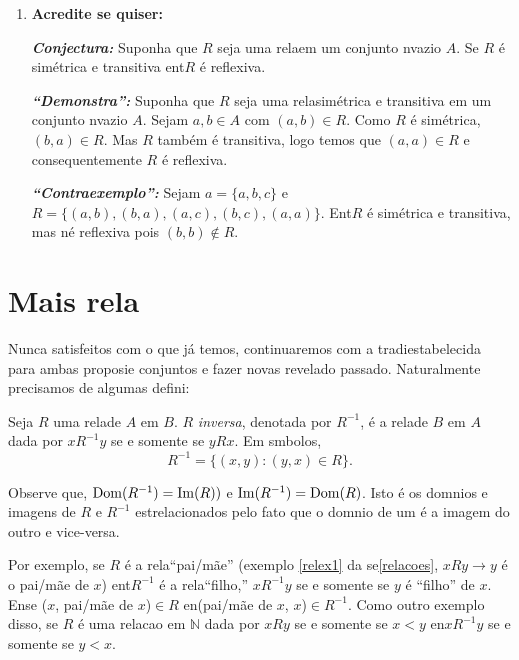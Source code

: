 \begin{enumerate}[{\bf 1.}]
\noindent \textit{\textbf{``Demonstra\caoi'':}} Seja $R$ uma rela\cao em um conjunto n\ao vazio $A$. Suponha $a,b\in A$ com $(a,b)\in R$. Como $R$ n\ao \'e sim\'etrica, $(b,a)\notin R$ logo $R$ \'e assim\'etrica.

\noindent \textit{\textbf{``Contraexemplo'':}} Sejam $A=\{1,2,3\}$ e $R=\{(1,2),(2,1),(1,3)\}$. Ent\ao $R$ n\ao \'e sim\'etrica nem assim\'etrica.

\item {\bf Acredite se quiser:}  

\noindent \textit{\textbf{Conjectura:}} Suponha que $R$ seja uma rela\cao em um conjunto n\ao vazio $A$. Se $R$ \'e sim\'etrica e transitiva ent\ao $R$ \'e reflexiva. 

\noindent \textit{\textbf{``Demonstra\caoi'':}} Suponha que $R$ seja uma rela\cao sim\'etrica e transitiva em um conjunto n\ao vazio $A$. Sejam $a,b\in A$ com $(a,b)\in R$. Como $R$ \'e sim\'etrica, $(b,a)\in R$. Mas $R$ tamb\'em \'e transitiva, logo temos que $(a,a)\in R$ e consequentemente $R$ \'e reflexiva.

\noindent \textit{\textbf{``Contraexemplo'':}} Sejam $a=\{a,b,c\}$ e $R=\{(a,b), (b,a), (a,c), (b,c), (a,a)\}$. Ent\ao $R$ \'e sim\'etrica e transitiva, mas n\ao \'e reflexiva pois $(b,b)\notin R$.
\end{enumerate}

\section{Mais rela\coes}\label{mrelacoes}

Nunca satisfeitos com o que j\'a temos, continuaremos com a tradi\cao estabelecida para ambas proposi\coes e conjuntos e fazer novas revela\coes do passado. Naturalmente precisamos de algumas defini\cois:
\begin{definb}
Seja $R$ uma rela\cao de $A$ em $B$. $R$ {\it inversa}, denotada por $R^{-1}$, \'e a rela\cao de $B$ em $A$ dada por $xR^{-1}y$ se e somente se $yRx$. Em s\ih mbolos,
\[
R^{-1}=\{(x,y):(y,x)\in R\}.
\]
\end{definb}

Observe que, $\operatorname{Dom}(R^{-1})=\operatorname{Im}(R))$ e $\operatorname{Im}(R^{-1})=\operatorname{Dom}(R)$. Isto \'e os dom\ih nios e imagens de $R$ e $R^{-1}$ est\ao relacionados pelo fato que o dom\ih nio de um \'e a imagem do outro e vice-versa.

Por exemplo, se $R$ \'e a rela\cao ``pai/m\~ae'' (exemplo \ref{relex1} da se\cao \ref{relacoes}, $xRy\to y$ \'e o pai/m\~ae de $x$) ent\ao $R^{-1}$ \'e a rela\cao ``filho,'' $xR^{-1}y$ se e somente se $y$ \'e ``filho'' de $x$. En\tao se ($x$, pai/m\~ae de $x$)$\in R$ en\tao (pai/m\~ae de $x$, $x$)$\in R^{-1}$. Como outro exemplo disso, se $R$ \'e uma relacao em $\mathbb{N}$ dada por $xRy$ se e somente se $x<y$ en\tao $xR^{-1}y$ se e somente se $y<x$.  

